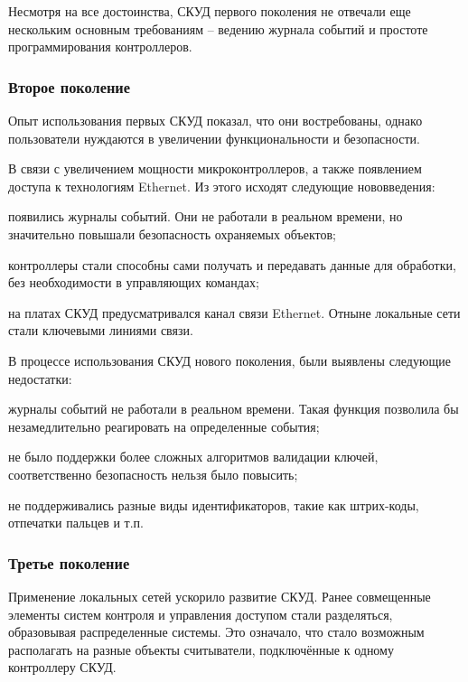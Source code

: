 Несмотря на все достоинства, СКУД первого поколения не отвечали еще нескольким основным требованиям -- ведению журнала событий и простоте программирования контроллеров.

\subsubsection{Второе поколение}

Опыт использования первых СКУД показал, что они востребованы, однако пользователи нуждаются в увеличении функциональности и безопасности.

В связи с увеличением мощности микроконтроллеров, а также появлением доступа к технологиям Ethernet. Из этого исходят следующие нововведения:

\begin{itemize*}
\item появились журналы событий. Они не работали в реальном времени, но значительно повышали безопасность охраняемых объектов;
\item контроллеры стали способны сами получать и передавать данные для обработки, без необходимости в управляющих командах;
\item на платах СКУД предусматривался канал связи Ethernet. Отныне локальные сети стали ключевыми линиями связи.
\end{itemize*}


В процессе использования СКУД нового поколения, были выявлены следующие недостатки:

\begin{itemize*}
\item журналы событий не работали в реальном времени. Такая функция позволила бы незамедлительно реагировать на определенные события;
\item не было поддержки более сложных алгоритмов валидации ключей, соответственно безопасность нельзя было повысить;
\item не поддерживались разные виды идентификаторов, такие как штрих-коды, отпечатки пальцев и т.п.
\end{itemize*}

\subsubsection{Третье поколение}

Применение локальных сетей ускорило развитие СКУД. Ранее совмещенные элементы систем контроля и управления доступом стали разделяться, образовывая распределенные системы. Это означало, что стало возможным располагать на разные объекты считыватели, подключённые к одному контроллеру СКУД.

